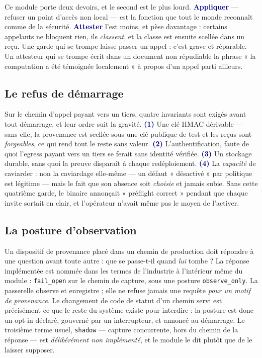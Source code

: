 \documentclass[10pt]{article}
\newcommand{\code}[1]{\texttt{\small #1}}
\newcommand{\mm}[1]{\textbf{\textcolor{navy}{#1}}}
\begin{document}
Ce module porte deux devoirs, et le second est le plus lourd. \mm{Appliquer} — refuser un point d'accès non local — est la fonction que tout le monde reconnaît comme de la sécurité. \mm{Attester} l'est moins, et pèse davantage : certains appelants ne bloquent rien, ils \emph{classent}, et la classe est ensuite scellée dans un reçu. Une garde qui se trompe laisse passer un appel : c'est grave et réparable. Un attesteur qui se trompe écrit dans un document non répudiable la phrase « la computation a été témoignée localement » à propos d'un appel parti ailleurs.

\subsection{Le refus de démarrage}

Sur le chemin d'appel payant vers un tiers, quatre invariants sont exigés avant tout démarrage, et leur ordre suit la gravité. \mm{(1)} Une clé HMAC dérivable — sans elle, la provenance est scellée sous une clé publique de test et les reçus sont \emph{forgeables}, ce qui rend tout le reste sans valeur. \mm{(2)} L'authentification, faute de quoi l'egress payant vers un tiers se ferait sans identité vérifiée. \mm{(3)} Un stockage durable, sans quoi la preuve disparaît à chaque redéploiement. \mm{(4)} La \emph{capacité} de caviarder : non la caviardage elle-même — un défaut « désactivé » par politique est légitime — mais le fait que son absence soit \emph{choisie} et jamais subie. Sans cette quatrième garde, le binaire annonçait « préflight correct » pendant que chaque invite sortait en clair, et l'opérateur n'avait même pas le moyen de l'activer.

\subsection{La posture d'observation}

Un dispositif de provenance placé dans un chemin de production doit répondre à une question avant toute autre : que se passe-t-il quand \emph{lui} tombe ? La réponse implémentée est nommée dans les termes de l'industrie à l'intérieur même du module : \code{fail\_open} sur le chemin de capture, sous une posture \code{observe\_only}. La passerelle observe et enregistre ; elle ne refuse jamais une requête \emph{pour un motif de provenance}. Le changement de code de statut d'un chemin servi est précisément ce que le reste du système existe pour interdire : la posture est donc un opt-in déclaré, gouverné par un interrupteur, et annoncé au démarrage. Le troisième terme usuel, \code{shadow} — capture concurrente, hors du chemin de la réponse — est \emph{délibérément non implémenté}, et le module le dit plutôt que de le laisser supposer.
\end{document}
